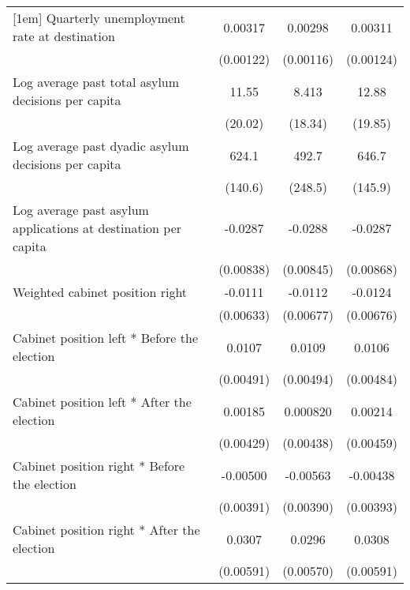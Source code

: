 \begin{table}[htbp]
\begin{tabular}{l*{3}{c}}
[1em]
Quarterly unemployment rate at destination&     0.00317\sym{*}  &     0.00298\sym{*}  &     0.00311\sym{*}  \\
                    &   (0.00122)         &   (0.00116)         &   (0.00124)         \\
[1em]
Log average past total asylum decisions per capita&       11.55         &       8.413         &       12.88         \\
                    &     (20.02)         &     (18.34)         &     (19.85)         \\
[1em]
Log average past dyadic asylum decisions per capita&       624.1\sym{***}&       492.7         &       646.7\sym{***}\\
                    &     (140.6)         &     (248.5)         &     (145.9)         \\
[1em]
Log average past asylum applications at destination per capita&     -0.0287\sym{**} &     -0.0288\sym{**} &     -0.0287\sym{**} \\
                    &   (0.00838)         &   (0.00845)         &   (0.00868)         \\
[1em]
Weighted cabinet position right&     -0.0111         &     -0.0112         &     -0.0124         \\
                    &   (0.00633)         &   (0.00677)         &   (0.00676)         \\
[1em]
Cabinet position left * Before the election&      0.0107\sym{*}  &      0.0109\sym{*}  &      0.0106\sym{*}  \\
                    &   (0.00491)         &   (0.00494)         &   (0.00484)         \\
[1em]
Cabinet position left * After the election&     0.00185         &    0.000820         &     0.00214         \\
                    &   (0.00429)         &   (0.00438)         &   (0.00459)         \\
[1em]
Cabinet position right * Before the election&    -0.00500         &    -0.00563         &    -0.00438         \\
                    &   (0.00391)         &   (0.00390)         &   (0.00393)         \\
[1em]
Cabinet position right * After the election&      0.0307\sym{***}&      0.0296\sym{***}&      0.0308\sym{***}\\
                    &   (0.00591)         &   (0.00570)         &   (0.00591)         \\

\end{tabular}
\end{table}
